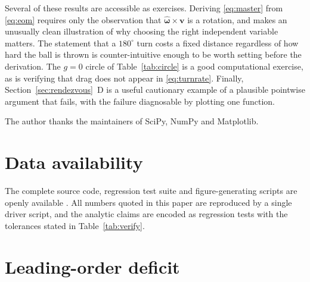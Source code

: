 \documentclass[aip,amsmath,amssymb,preprint,floatfix]{revtex4-2}
\newcommand{\vv}{\bm{v}}
\newcommand{\omhat}{\hat{\bm{\omega}}}
\begin{document}
Several of these results are accessible as exercises. Deriving \eqref{eq:master} from
\eqref{eq:eom} requires only the observation that $\omhat\times\vv$ is a rotation, and
makes an unusually clean illustration of why choosing the right independent variable
matters. The statement that a $180^\circ$ turn costs a fixed distance regardless of
how hard the ball is thrown is counter-intuitive enough to be worth setting before the
derivation. The $g=0$ circle of Table~\ref{tab:circle} is a good computational
exercise, as is verifying that drag does not appear in \eqref{eq:turnrate}. Finally,
Section~\ref{sec:rendezvous}~D is a useful cautionary example of a plausible pointwise
argument that fails, with the failure diagnosable by plotting one function.

\begin{acknowledgments}
The author thanks the maintainers of SciPy, NumPy and Matplotlib.
\end{acknowledgments}

\section*{Data availability}

The complete source code, regression test suite and figure-generating scripts are
openly available \cite{ThisCode}. All numbers quoted in this paper are reproduced by
a single driver script, and the analytic claims are encoded as regression tests with
the tolerances stated in Table~\ref{tab:verify}.

\appendix

\section{Leading-order deficit}
\label{app:pert}
\end{document}
